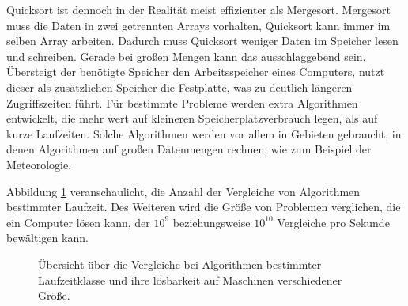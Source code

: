 Quicksort ist dennoch in der Realität meist effizienter als Mergesort. Mergesort muss die Daten in zwei getrennten Arrays vorhalten, Quicksort kann immer im selben Array arbeiten. Dadurch muss Quicksort weniger Daten im Speicher lesen und schreiben. Gerade bei großen Mengen kann das ausschlaggebend sein. Übersteigt der benötigte Speicher den Arbeitsspeicher eines Computers, nutzt dieser als zusätzlichen Speicher die Festplatte, was zu deutlich längeren Zugriffszeiten führt. Für bestimmte Probleme werden extra Algorithmen entwickelt, die mehr wert auf kleineren Speicherplatzverbrauch legen, als auf kurze Laufzeiten. Solche Algorithmen werden vor allem in Gebieten gebraucht, in denen Algorithmen auf großen Datenmengen rechnen, wie zum Beispiel der Meteorologie.

Abbildung \ref{groessenvergleich} veranschaulicht, die Anzahl der Vergleiche von Algorithmen bestimmter Laufzeit. Des Weiteren wird die Größe von Problemen verglichen, die ein Computer lösen kann, der $10^9$ beziehungsweise $10^{10}$ Vergleiche pro Sekunde bewältigen kann.

\begin{figure}[hbt]
  \centering
  
  \quad
  \caption{Übersicht über die Vergleiche bei Algorithmen bestimmter Laufzeitklasse und ihre lösbarkeit auf Maschinen verschiedener Größe.}
  \label{groessenvergleich}
\end{figure}


